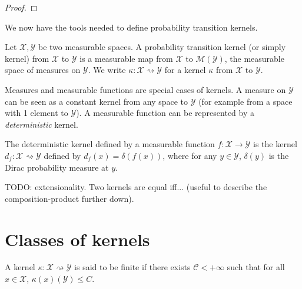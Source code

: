 \begin{proof}\leanok
\uses{}
\end{proof}

We now have the tools needed to define probability transition kernels.

\begin{definition}[Kernel]
  \label{def:kernel}
  \leanok
  Let $\mathcal X, \mathcal Y$ be two measurable spaces.
  A probability transition kernel (or simply kernel) from $\mathcal X$ to $\mathcal Y$ is a measurable map from $\mathcal X$ to $\mathcal M (\mathcal Y)$, the measurable space of measures on $\mathcal Y$.
  We write $\kappa : \mathcal X \rightsquigarrow \mathcal Y$ for a kernel $\kappa$ from $\mathcal X$ to $\mathcal Y$.
\end{definition}

Measures and measurable functions are special cases of kernels. A measure on $\mathcal Y$ can be seen as a constant kernel from any space to $\mathcal Y$ (for example from a space with 1 element to $\mathcal Y$).
A measurable function can be represented by a \emph{deterministic} kernel.

\begin{definition}
  \label{def:deterministic_kernel}
  \leanok
  The deterministic kernel defined by a measurable function $f : \mathcal X \to \mathcal Y$ is the kernel $d_f: \mathcal X \rightsquigarrow \mathcal Y$ defined by $d_f(x) = \delta(f(x))$, where for any $y \in \mathcal Y$, $\delta(y)$ is the Dirac probability measure at $y$.
\end{definition}

TODO: extensionality. Two kernels are equal iff... (useful to describe the composition-product further down).

\section{Classes of kernels}

\begin{definition}
  \label{def:finite_kernel}
  \leanok
  A kernel $\kappa : \mathcal X \rightsquigarrow \mathcal Y$ is said to be finite if there exists $\mathcal C < +\infty$ such that for all $x \in \mathcal X$, $\kappa(x)(\mathcal Y) \le C$.
\end{definition}

